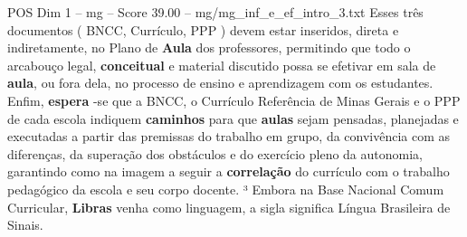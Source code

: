 \begin{textsample}{POS Dim 1 – mg – Score 39.00 – mg/mg\_inf\_e\_ef\_intro\_3.txt}
Esses três documentos ( BNCC, Currículo, PPP ) devem estar inseridos, direta e indiretamente, no Plano de \textbf{Aula} dos professores, permitindo que todo o arcabouço legal, \textbf{conceitual} e material discutido possa se efetivar em sala de \textbf{aula}, ou fora dela, no processo de ensino e aprendizagem com os estudantes.
Enfim, \textbf{espera} -se que a BNCC, o Currículo Referência de Minas Gerais e o PPP de cada escola indiquem \textbf{caminhos} para que \textbf{aulas} sejam pensadas, planejadas e executadas a partir das premissas do trabalho em grupo, da convivência com as diferenças, da superação dos obstáculos e do exercício pleno da autonomia, garantindo como na imagem a seguir a \textbf{correlação} do currículo com o trabalho pedagógico da escola e seu corpo docente. ³ Embora na Base Nacional Comum Curricular, \textbf{Libras} venha como linguagem, a sigla significa Língua Brasileira de Sinais.

\end{textsample}
